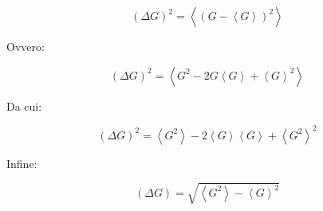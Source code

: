 	\begin{equation}
		(\Delta G)^2 = \left \langle (G - \left \langle G \right \rangle) ^2 \right \rangle
	\end{equation}

Ovvero:

	\begin{equation}
		(\Delta G)^2 = \left \langle G^2 - 2 G \left \langle G \right \rangle + \left \langle G \right \rangle ^2 \right \rangle
	\end{equation}

Da cui:

	\begin{equation}
		(\Delta G)^2 = \left \langle G^2 \right \rangle - 2 \left \langle G \right \rangle \left \langle G \right \rangle + \left \langle G^2 \right \rangle^2
	\end{equation}

Infine:

	\begin{equation}
		(\Delta G) = \sqrt{ \left \langle G^2 \right \rangle - \left \langle G \right \rangle ^ 2 }
	\end{equation}
